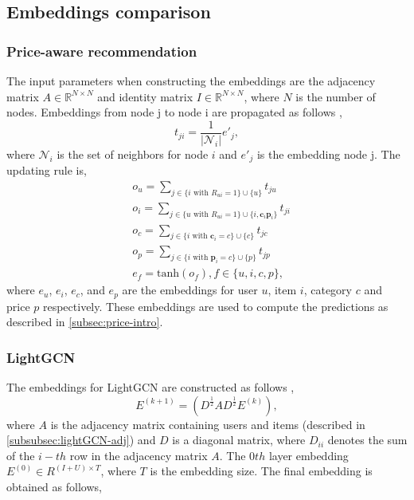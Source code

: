 \subsection{Embeddings comparison}
\subsubsection{Price-aware recommendation}\label{subsubsec:price}
The input parameters when constructing the embeddings are the adjacency matrix $A \in \mathbb{R}^{N \times N}$ and identity matrix $I \in \mathbb{R}^{N \times N}$, where $N$ is the number of nodes.
Embeddings from node j to node i are propagated as follows \cite{Priceaware},
\begin{equation}
    t_{ji} = \frac{1}{|\mathcal{N}_i|}e'_j,
\end{equation}
where $\mathcal{N}_i$ is the set of neighbors for node $i$ and $e'_j$ is the embedding node j.
The updating rule is,
\begin{align*}
     & o_u = \sum_{j \in \{i \textrm{ with } R_{ui}=1 \} \cup \{ u\}}^{} t_{ju}                            \\
     & o_i = \sum_{j \in \{u \textrm{ with } R_{ui}=1 \} \cup \{ i, \textbf{c}_i \textbf{p}_i\}}^{} t_{ji} \\
     & o_c = \sum_{j \in \{i \textrm{ with } \textbf{c}_i=c \} \cup \{ c\}}^{} t_{jc}                      \\
     & o_p = \sum_{j \in \{i \textrm{ with } \textbf{p}_i=c \} \cup \{ p\}}^{} t_{jp}                      \\
     & e_f = \textrm{tanh}(o_f), f \in \{u, i, c, p\},
\end{align*}
where $e_u$, $e_i$, $e_c$, and $e_p$ are the embeddings for user $u$, item $i$, category $c$ and price $p$ respectively.
These embeddings are used to compute the predictions as described in \autoref{subsec:price-intro}.

\subsubsection{LightGCN}\label{subsubsec:lightgcn-embedding}
The embeddings for LightGCN are constructed as follows \cite{lightgcn},
\begin{equation}
    E^{(k+1)} = (D^{\frac{1}{2}}AD^{\frac{1}{2}}E^{(k)}),
\end{equation}
where $A$ is the adjacency matrix containing users and items (described in \autoref{subsubsec:lightGCN-adj}) and $D$ is a diagonal matrix, where $D_{ii}$ denotes the sum of the $i-th$ row in the adjacency matrix $A$.
The $0th$ layer embedding $E^{(0)} \in R^{(I + U)\times T}$, where $T$ is the embedding size.
The final embedding is obtained as follows,

